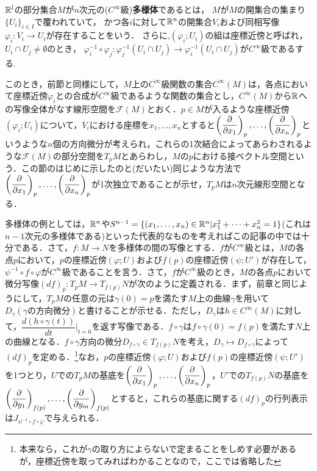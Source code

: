 \begin{s_defi}
${\mathbb R}^l$の部分集合$M$が$n$次元の($C^\infty$級)\textbf{多様体}であるとは，
$M$が$M$の開集合の集まり$\{U_i\}_{i\in I}$で覆われていて，
かつ各$i$に対して${\mathbb R}^n$の開集合$V_i$および同相写像$\varphi_i:V_i\rightarrow U_i$が存在することをいう．
さらに,$(\varphi_i;U_i)$の組は座標近傍と呼ばれ，
$U_i\cap U_j\neq \emptyset$のとき，
$\varphi_i^{-1}\circ\varphi_j:\varphi_j^{-1}(U_i\cap U_j)\rightarrow\varphi_i^{-1}(U_i\cap U_j)$が$C^{\infty}$級であるする.
\end{s_defi}



このとき，前節と同様にして，$M$上の$C^{\infty}$級関数の集合$C^{\infty}(M)$は，各点において座標近傍$\varphi_i$との合成が$C^{\infty}$級であるような関数の集合とし，$C^{\infty}(M)$から${\mathbb R}$への写像全体がなす線形空間を${\mathcal F}(M)$とおく．$p\in M$が入るような座標近傍$(\varphi_i;U_i)$について，$V_i$における座標を$x_1,\dots,x_n$とすると$\left(\displaystyle\frac{\partial}{\partial x_1}\right)_p,\dots,\left(\displaystyle\frac{\partial}{\partial x_n}\right)_p$というような$n$個の方向微分が考えられ，これらの1次結合によってあらわされるような${\mathcal F}(M)$の部分空間を$T_pM$とあらわし，$M$の$p$における接ベクトル空間という．この節のはじめに示したのと(だいたい)同じような方法で$\left(\displaystyle\frac{\partial}{\partial x_1}\right)_p,\dots,\left(\displaystyle\frac{\partial}{\partial x_n}\right)_p$が1次独立であることが示せ，$T_pM$は$n$次元線形空間となる．\par


多様体の例としては，${\mathbb R}^n$や$S^{n-1}=\{(x_1,\dots,x_n)\in{\mathbb R}^n|x_1^2+\dots+x_n^2=1\}$(これは$n-1$次元の多様体である)といった代表的なものを考えればこの記事の中では十分である．さて，$f:M\rightarrow N$を多様体の間の写像とする．$f$が$C^{\infty}$級とは，$M$の各点$p$において，$p$の座標近傍$(\varphi;U)$および$f(p)$の座標近傍$(\psi;U')$が存在して，$\psi^{-1}\circ f\circ\varphi$が$C^{\infty}$級であることを言う．さて，$f$が$C^{\infty}$級のとき，$M$の各点$p$において微分写像$(df)_p:T_pM\rightarrow T_{f(p)}N$が次のように定義される．まず，前章と同じようにして，$T_pM$の任意の元は$\gamma(0)=p$を満たす$M$上の曲線$\gamma$を用いて$D_\gamma(\gamma の方向微分)$と書けることが示せる．ただし，$D_\gamma$は$h\in C^\infty(M)$に対して，$\dfrac{d(h\circ\gamma(t))}{dt}\Big|_{t=0}$を返す写像である．$f\circ\gamma$は$f\circ\gamma(0)=f(p)$を満たす$N$上の曲線となる．$f\circ\gamma$方向の微分$D_{f\circ\gamma}\in T_{f(p)}N$を考え，$D_{\gamma}\mapsto D_{f\circ\gamma}$によって$(df)_p$を定める．\footnote{本来なら，これが$\gamma$の取り方によらないで定まることをしめす必要があるが，座標近傍を取ってみればわかることなので，ここでは省略した}なお，$p$の座標近傍$(\varphi;U)$および$f(p)$の座標近傍$(\psi;U')$を1つとり，$U$での$T_pM$の基底を$\left(\displaystyle\frac{\partial}{\partial x_1}\right)_p,\dots,\left(\displaystyle\frac{\partial}{\partial x_n}\right)_p$，$U'$での$T_{f(p)}N$の基底を$\left(\displaystyle\frac{\partial}{\partial y_1}\right)_{f(p)},\dots,\left(\displaystyle\frac{\partial}{\partial y_m}\right)_{f(p)}$とすると，これらの基底に関する$(df)_p$の行列表示は$J_{\psi^{-1}\circ f\circ\varphi}$で与えられる．


